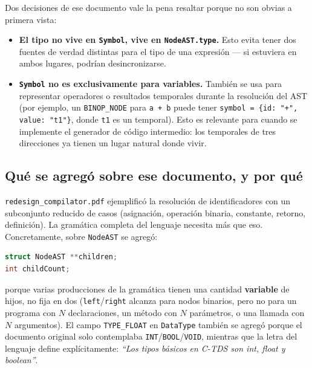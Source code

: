 \documentclass[11pt,a4paper]{article}
\begin{document}
Dos decisiones de ese documento vale la pena resaltar porque no son
obvias a primera vista:

\begin{itemize}
    \item \textbf{El tipo no vive en \texttt{Symbol}, vive en
        \texttt{NodeAST.type}.} Esto evita tener dos fuentes de verdad
        distintas para el tipo de una expresi\'on --- si estuviera en
        ambos lugares, podr\'ian desincronizarse.
    \item \textbf{\texttt{Symbol} no es exclusivamente para variables.}
        Tambi\'en se usa para representar operadores o resultados
        temporales durante la resoluci\'on del AST (por ejemplo, un
        \texttt{BINOP\_NODE} para \texttt{a + b} puede tener
        \texttt{symbol = \{id: "+", value: "t1"\}}, donde \texttt{t1}
        es un temporal). Esto es relevante para cuando se implemente
        el generador de c\'odigo intermedio: los temporales de tres
        direcciones ya tienen un lugar natural donde vivir.
\end{itemize}

\subsection{Qu\'e se agreg\'o sobre ese documento, y por qu\'e}

\texttt{redesign\_compilator.pdf} ejemplific\'o la resoluci\'on de
identificadores con un subconjunto reducido de casos (asignaci\'on,
operaci\'on binaria, constante, retorno, definici\'on). La gram\'atica
completa del lenguaje necesita m\'as que eso. Concretamente, sobre
\texttt{NodeAST} se agreg\'o:

\begin{lstlisting}[language=C]
struct NodeAST **children;
int childCount;
\end{lstlisting}

porque varias producciones de la gram\'atica tienen una cantidad
\textbf{variable} de hijos, no fija en dos (\texttt{left}/\texttt{right}
alcanza para nodos binarios, pero no para un programa con $N$
declaraciones, un m\'etodo con $N$ par\'ametros, o una llamada con $N$
argumentos). El campo \texttt{TYPE\_FLOAT} en \texttt{DataType} tambi\'en
se agreg\'o porque el documento original solo contemplaba
\texttt{INT}/\texttt{BOOL}/\texttt{VOID}, mientras que la letra del
lenguaje define expl\'icitamente: \emph{``Los tipos b\'asicos en C-TDS son
int, float y boolean''}.
\end{document}
